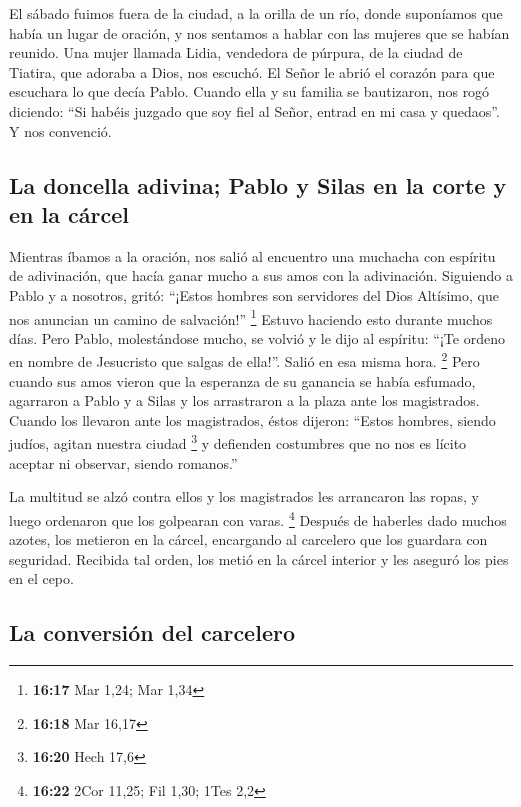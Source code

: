  El sábado fuimos fuera de la ciudad, a la orilla de un
río, donde suponíamos que había un lugar de oración, y nos sentamos a
hablar con las mujeres que se habían reunido.  Una mujer
llamada Lidia, vendedora de púrpura, de la ciudad de Tiatira, que
adoraba a Dios, nos escuchó. El Señor le abrió el corazón para que
escuchara lo que decía Pablo.  Cuando ella y su familia
se bautizaron, nos rogó diciendo: ``Si habéis juzgado que soy fiel al
Señor, entrad en mi casa y quedaos''. Y nos convenció.

\hypertarget{la-doncella-adivina-pablo-y-silas-en-la-corte-y-en-la-cuxe1rcel}{%
\subsection{La doncella adivina; Pablo y Silas en la corte y en la
cárcel}\label{la-doncella-adivina-pablo-y-silas-en-la-corte-y-en-la-cuxe1rcel}}

 Mientras íbamos a la oración, nos salió al encuentro una
muchacha con espíritu de adivinación, que hacía ganar mucho a sus amos
con la adivinación.  Siguiendo a Pablo y a nosotros,
gritó: ``¡Estos hombres son servidores del Dios Altísimo, que nos
anuncian un camino de salvación!'' \footnote{\textbf{16:17} Mar 1,24;
  Mar 1,34}  Estuvo haciendo esto durante muchos días.
Pero Pablo, molestándose mucho, se volvió y le dijo al espíritu: ``¡Te
ordeno en nombre de Jesucristo que salgas de ella!''. Salió en esa misma
hora. \footnote{\textbf{16:18} Mar 16,17}  Pero cuando
sus amos vieron que la esperanza de su ganancia se había esfumado,
agarraron a Pablo y a Silas y los arrastraron a la plaza ante los
magistrados.  Cuando los llevaron ante los magistrados,
éstos dijeron: ``Estos hombres, siendo judíos, agitan nuestra ciudad
\footnote{\textbf{16:20} Hech 17,6}  y defienden
costumbres que no nos es lícito aceptar ni observar, siendo romanos.''

 La multitud se alzó contra ellos y los magistrados les
arrancaron las ropas, y luego ordenaron que los golpearan con varas.
\footnote{\textbf{16:22} 2Cor 11,25; Fil 1,30; 1Tes 2,2} 
Después de haberles dado muchos azotes, los metieron en la cárcel,
encargando al carcelero que los guardara con seguridad. 
Recibida tal orden, los metió en la cárcel interior y les aseguró los
pies en el cepo.

\hypertarget{la-conversiuxf3n-del-carcelero}{%
\subsection{La conversión del
carcelero}\label{la-conversiuxf3n-del-carcelero}}

